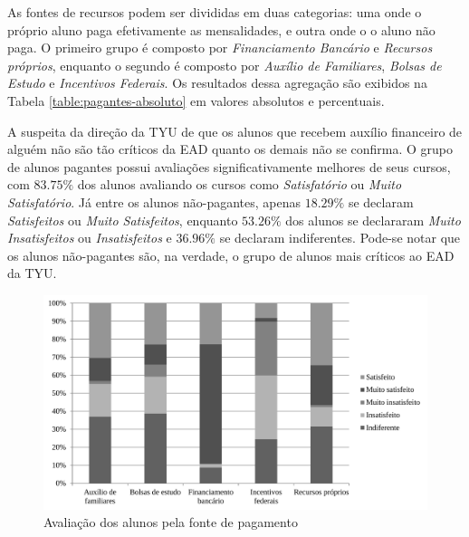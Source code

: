 \documentclass[10pt,a4paper,oneside]{article}
\begin{document}
As fontes de recursos podem ser divididas em duas categorias: uma onde o próprio aluno paga efetivamente as mensalidades, e outra onde o o aluno não paga. O primeiro grupo é composto por \textit{Financiamento Bancário} e \textit{Recursos próprios}, enquanto o segundo é composto por \textit{Auxílio de Familiares}, \textit{Bolsas de Estudo} e \textit{Incentivos Federais}. Os resultados dessa agregação são exibidos na Tabela \ref{table:pagantes-absoluto} em valores absolutos e percentuais.

A suspeita da direção da TYU de que os alunos que recebem auxílio financeiro de alguém não são tão críticos da EAD quanto os demais não se confirma. O grupo de alunos pagantes possui avaliações significativamente melhores de seus cursos, com $83.75\%$ dos alunos avaliando os cursos como \textit{Satisfatório} ou \textit{Muito Satisfatório}. Já entre os alunos não-pagantes, apenas $18.29\%$ se declaram \textit{Satisfeitos} ou \textit{Muito Satisfeitos}, enquanto $53.26\%$ dos alunos se declararam \textit{Muito Insatisfeitos} ou \textit{Insatisfeitos} e $36.96\%$ se declaram indiferentes. Pode-se notar que os alunos não-pagantes são, na verdade, o grupo de alunos mais críticos ao EAD da TYU.

\begin{figure}
	\centering
	\includegraphics[width=0.80\linewidth]{plots/q12}
	\caption{Avaliação dos alunos pela fonte de pagamento}
	\label{figure: avaliacao por fonte de pagamento}
\end{figure}
\end{document}
